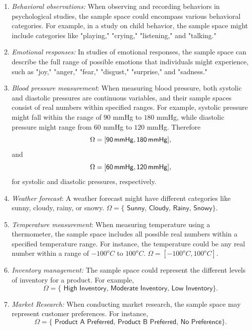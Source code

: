 \documentclass{tufte-handout}
\begin{document}
\begin{enumerate}
\item \textit{Behavioral observations:} When observing and recording behaviors in psychological studies, the sample space could encompass various behavioral categories. For example, in a study on child behavior, the sample space might include categories like "playing," "crying," "listening," and "talking."

\item \textit{Emotional responses:} In studies of emotional responses, the sample space can describe the full range of possible emotions that individuals might experience, such as "joy," "anger," "fear," "disgust," "surprise," and "sadness."

\item \textit{Blood pressure measurement}: When measuring blood pressure, both systolic and diastolic pressures are continuous variables, and their sample spaces consist of real numbers within specified ranges. For example, systolic pressure might fall within the range of $90$ mmHg to $180$ mmHg, while diastolic pressure might range from $60$ mmHg to $120$ mmHg.  Therefore 
$$\Omega = \sf  [90\,mmHg, 180\,mmHg],$$  and  $$\Omega = \sf  [60\,mmHg, 120\,mmHg],$$ for systolic and diastolic pressures, respectively.

\item \textit{Weather forecast}: A weather forecast might have different categories like sunny, cloudy, rainy, or snowy.
$\Omega = \{\textsf{ Sunny, Cloudy, Rainy, Snowy}\}.$

\item \textit{Temperature measurement}: When measuring temperature using a thermometer, the sample space includes all possible real numbers within a specified temperature range. For instance, the temperature could be any real number within a range of $-100 ^oC$ to $100 ^oC$.
$\Omega = [-100 ^oC, 100 ^oC]$.

\item \textit{Inventory management:} The sample space could represent the different levels of inventory for a product. For example, $$\Omega = \{\textsf{ High Inventory, Moderate Inventory, Low Inventory}\}.$$

\item \textit{Market Research:}
 When conducting market research, the sample space may represent customer preferences. For instance, 
  $$\Omega = \{\textsf{ Product A Preferred, Product B Preferred, No Preference}\}.$$



\end{enumerate}
\end{document}
